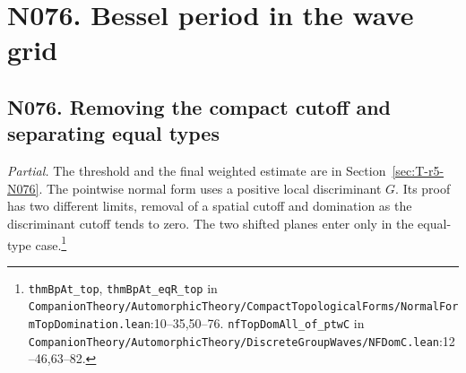 \section*{N076. Bessel period in the wave grid}

\subsection{N076. Removing the compact cutoff and separating equal types}\label{r6:N076}
\textit{Partial.} The threshold and the final weighted estimate are in Section~\ref{sec:T-r5-N076}. The pointwise normal form uses a positive local discriminant $G$. Its proof has two different limits, removal of a spatial cutoff and domination as the discriminant cutoff tends to zero. The two shifted planes enter only in the equal-type case.\footnote{\nolinkurl{thmBpAt_top}, \nolinkurl{thmBpAt_eqR_top} in \nolinkurl{CompanionTheory/AutomorphicTheory/CompactTopologicalForms/NormalFormTopDomination.lean}\allowbreak:10--35,50--76. \nolinkurl{nfTopDomAll_of_ptwC} in \nolinkurl{CompanionTheory/AutomorphicTheory/DiscreteGroupWaves/NFDomC.lean}\allowbreak:12--46,63--82.}

